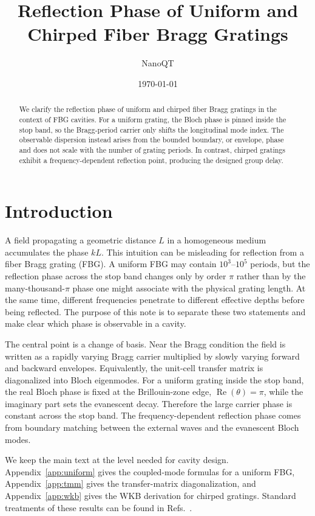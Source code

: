 \documentclass[aps,pra,twocolumn,superscriptaddress,nofootinbib]{revtex4-2}
\renewcommand{\Re}{\operatorname{Re}}
\begin{document}
\title{Reflection Phase of Uniform and Chirped Fiber Bragg Gratings}
\author{NanoQT}
\date{\today}

\begin{abstract}
We clarify the reflection phase of uniform and chirped fiber Bragg gratings in the context of FBG cavities. 
For a uniform grating, the Bloch phase is pinned inside the stop band, so the Bragg-period carrier only shifts the longitudinal mode index.
The observable dispersion instead arises from the bounded boundary, or envelope, phase and does not scale with the number of grating periods. 
In contrast, chirped gratings exhibit a frequency-dependent reflection point, producing the designed group delay.
\end{abstract}

\maketitle

\section{Introduction}

A field propagating a geometric distance $L$ in a homogeneous medium accumulates the phase $kL$.  This intuition can be misleading for reflection from a fiber Bragg grating (FBG).  A uniform FBG may contain $10^3$--$10^5$ periods, but the reflection phase across the stop band changes only by order $\pi$ rather than by the many-thousand-$\pi$ phase one might associate with the physical grating length.  At the same time, different frequencies penetrate to different effective depths before being reflected.  The purpose of this note is to separate these two statements and make clear which phase is observable in a cavity.

The central point is a change of basis.  Near the Bragg condition the field is written as a rapidly varying Bragg carrier multiplied by slowly varying forward and backward envelopes.  Equivalently, the unit-cell transfer matrix is diagonalized into Bloch eigenmodes.  For a uniform grating inside the stop band, the real Bloch phase is fixed at the Brillouin-zone edge, $\Re(\theta)=\pi$, while the imaginary part sets the evanescent decay.  Therefore the large carrier phase is constant across the stop band.  The frequency-dependent reflection phase comes from boundary matching between the external waves and the evanescent Bloch modes.

We keep the main text at the level needed for cavity design.  Appendix~\ref{app:uniform} gives the coupled-mode formulas for a uniform FBG, Appendix~\ref{app:tmm} gives the transfer-matrix diagonalization, and Appendix~\ref{app:wkb} gives the WKB derivation for chirped gratings.  Standard treatments of these results can be found in Refs.~\cite{Erdogan1997,OthonosKalli1999,Kashyap2009,YarivYeh1984,Joannopoulos2008}.
\end{document}
